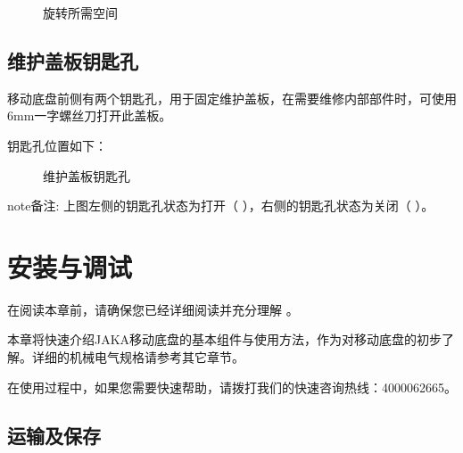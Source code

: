 \documentclass[a4paper,11pt,english,openany,oneside]{sphinxmanual}
\begin{document}
\begin{figure}[H]
\centering
\capstart

\noindent{}
\caption{旋转所需空间}\label{\detokenize{07 _u6280_u672f_u89c4_u683c:id69}}\end{figure}


\section{维护盖板钥匙孔}
\label{\detokenize{07 _u6280_u672f_u89c4_u683c:id44}}\label{\detokenize{07 _u6280_u672f_u89c4_u683c:id45}}
\sphinxAtStartPar
移动底盘前侧有两个钥匙孔，用于固定维护盖板，在需要维修内部部件时，可使用6mm一字螺丝刀打开此盖板。

\sphinxAtStartPar
钥匙孔位置如下：

\begin{figure}[H]
\centering
\capstart

\noindent{}
\caption{维护盖板钥匙孔}\label{\detokenize{07 _u6280_u672f_u89c4_u683c:id70}}\end{figure}

\begin{sphinxadmonition}{note}{备注:}
\sphinxAtStartPar
上图左侧的钥匙孔状态为打开（  ），右侧的钥匙孔状态为关闭（  ）。
\end{sphinxadmonition}

\sphinxstepscope


\chapter{安装与调试}
\label{\detokenize{08 _u5b89_u88c5_u4e0e_u8c03_u8bd5:id1}}\label{\detokenize{08 _u5b89_u88c5_u4e0e_u8c03_u8bd5:id2}}\label{\detokenize{08 _u5b89_u88c5_u4e0e_u8c03_u8bd5::doc}}
\sphinxAtStartPar
在阅读本章前，请确保您已经详细阅读并充分理解 {\hyperref[\detokenize{05 _u5b89_u5168_u89c4_u8303:id1}]{}} 。

\sphinxAtStartPar
本章将快速介绍JAKA移动底盘的基本组件与使用方法，作为对移动底盘的初步了解。详细的机械电气规格请参考其它章节。

\sphinxAtStartPar
在使用过程中，如果您需要快速帮助，请拨打我们的快速咨询热线：400\sphinxhyphen{}006\sphinxhyphen{}2665。


\section{运输及保存}
\label{\detokenize{08 _u5b89_u88c5_u4e0e_u8c03_u8bd5:id3}}\label{\detokenize{08 _u5b89_u88c5_u4e0e_u8c03_u8bd5:id4}}
\end{document}

